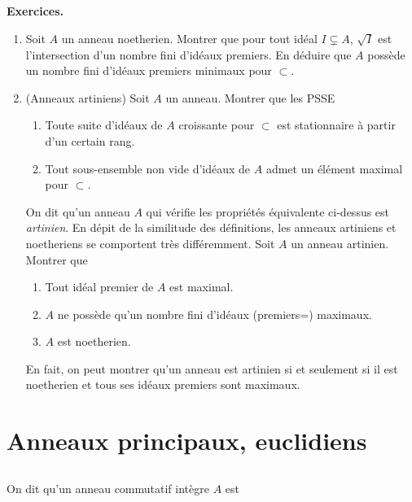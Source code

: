 \documentclass[a4paper, 12pt]{amsart}
\begin{document}
\subsection{}\label{NoethExercices}\textbf{Exercices.}\\
    \begin{enumerate}[leftmargin=* ,parsep=0cm,itemsep=0cm,topsep=0cm]
     \item  Soit $A$ un anneau noetherien. Montrer que pour tout idéal  $I\subsetneq A$, $\sqrt{I}$ est l'intersection d'un nombre fini d'idéaux premiers. En déduire que $A$ possède un nombre fini d'idéaux premiers minimaux pour $\subset$. \\
     \item   (Anneaux artiniens) Soit $A$ un anneau. Montrer que les PSSE\\
       \begin{enumerate} 
     \item  Toute suite  d'idéaux de $A$ croissante pour $\subset$ est stationnaire à partir d'un certain rang.
     \item Tout sous-ensemble non vide d'idéaux de $A$ admet un élément maximal pour $\subset $.\\
\end{enumerate}
\noindent On dit qu'un anneau $A$ qui vérifie les propriétés équivalente ci-dessus est \textit{artinien}. En dépit de la similitude des définitions, les anneaux artiniens et noetheriens se comportent très différemment. Soit $A$ un anneau artinien. Montrer que\\
 \begin{enumerate} 
     \item  Tout idéal premier de $A $ est maximal.
     \item  $A$ ne possède qu'un nombre fini d'idéaux (premiers=) maximaux.
      \item  $A$ est noetherien.\\
\end{enumerate}
En fait, on peut montrer qu'un anneau est artinien si et seulement si il est noetherien et tous ses idéaux premiers sont maximaux. 
\end{enumerate}



  \section{Anneaux principaux, euclidiens } 

\subsection{ }\hspace{-0.cm}On dit qu'un anneau commutatif intègre $A$ est \\
\end{document}
